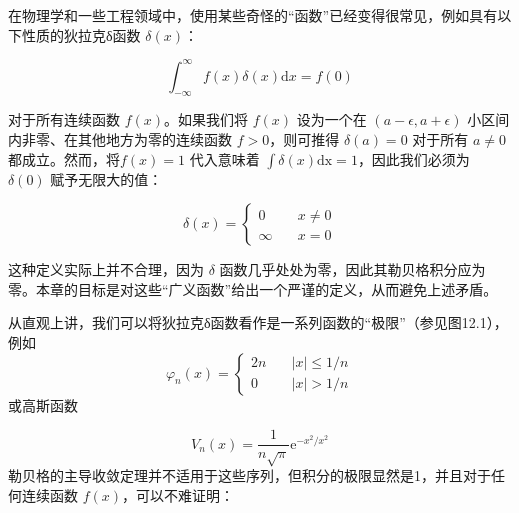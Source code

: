在物理学和一些工程领域中，使用某些奇怪的``函数''已经变得很常见，例如具有以下性质的狄拉克δ函数
$\delta(x)$：

$$
\int_{-\infty}^{\infty} f(x) \delta(x) \mathrm{d} x=f(0)
$$

对于所有连续函数 $f(x)$。如果我们将 $f(x)$ 设为一个在
$(a-\epsilon, a+\epsilon)$ 小区间内非零、在其他地方为零的连续函数
$f > 0$，则可推得 $\delta(a) = 0$ 对于所有 $a \neq 0$都成立。然而，将$f(x)=1$ 代入意味着 $\int \delta(x) \mathrm{dx}=1$，因此我们必须为
$\delta(0)$ 赋予无限大的值：

$$
\delta(x)= \begin{cases}0 & \quad x \neq 0 \\ \infty & \quad x=0\end{cases}
$$

这种定义实际上并不合理，因为 $\delta$
函数几乎处处为零，因此其勒贝格积分应为零。本章的目标是对这些``广义函数''给出一个严谨的定义，从而避免上述矛盾。

从直观上讲，我们可以将狄拉克δ函数看作是一系列函数的``极限''（参见图12.1），例如
\begin{equation}
  \varphi_n(x)= \begin{cases}2 n & \quad|x| \leq 1 / n \\ 0 & \quad|x|>1 / n\end{cases}
\end{equation}
或高斯函数

$$
V_n(x)=\frac{1}{n \sqrt{\pi}} \mathrm{e}^{-x^2 / x^2}
$$
勒贝格的主导收敛定理并不适用于这些序列，但积分的极限显然是1，并且对于任何连续函数
$f(x)$，可以不难证明：

